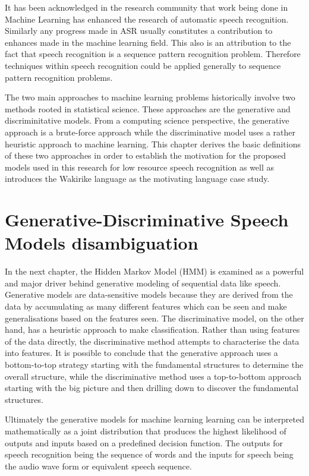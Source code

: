 It has been acknowledged in the research community \citep{2015watanabe,deng2013machine}  that work being done in Machine Learning has enhanced the research of automatic speech recognition.  Similarly any progress made in ASR usually constitutes a contribution to enhances made in the machine learning field.  This also is an attribution to the fact that speech recognition is a sequence pattern recognition problem.  Therefore techniques within speech recognition could be applied generally to sequence pattern recognition problems.

The two main approaches to machine learning problems historically involve two methods rooted in statistical science.  These approaches are the generative and discriminitative models.  From a computing science perspective, the generative approach is a brute-force approach while the discriminative model uses a rather heuristic approach to machine learning. This chapter derives the basic definitions of these two approaches in order to establish the motivation for the proposed models used in this research for low resource speech recognition as well as introduces the Wakirike language as the motivating language case study.


\section{Generative-Discriminative Speech Models disambiguation}
\pagestyle{fancy}
In the next chapter, the Hidden Markov Model (HMM) is examined as a powerful and major driver behind generative modeling of sequential data like speech.  Generative models are data-sensitive models because they are derived from the data by accumulating as many different features which can be seen and make generalisations based on the features seen. The discriminative model, on the other hand, has a heuristic approach to make classification.  Rather than using features of the data directly, the discriminative method attempts to characterise the data into features. It is possible to conclude that the generative approach uses a bottom-to-top strategy starting with the fundamental structures to determine the overall structure, while the discriminative method uses a top-to-bottom approach starting with the big picture and then drilling down to discover the fundamental structures.

Ultimately the generative models for machine learning learning can be interpreted mathematically as a joint distribution that produces the highest likelihood of outputs and inputs based on a predefined decision function.  The outputs for speech recognition being the sequence of words and the inputs for speech being the audio wave form or equivalent speech sequence.

